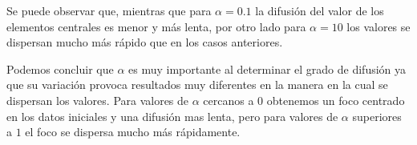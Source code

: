 Se puede observar que, mientras que para $\alpha=0.1$ la difusión del valor de los elementos centrales es menor y más lenta, por otro lado para $\alpha = 10$ los valores se dispersan mucho más rápido que en los casos anteriores.

Podemos concluir que $\alpha$ es muy importante al determinar el grado de difusión ya que su variación provoca resultados muy diferentes en la manera en la cual se dispersan los valores.
Para valores de $\alpha$ cercanos a $0$ obtenemos un foco centrado en los datos iniciales y una difusión mas lenta, pero para valores de $\alpha$ superiores a $1$ el foco se dispersa mucho más rápidamente.